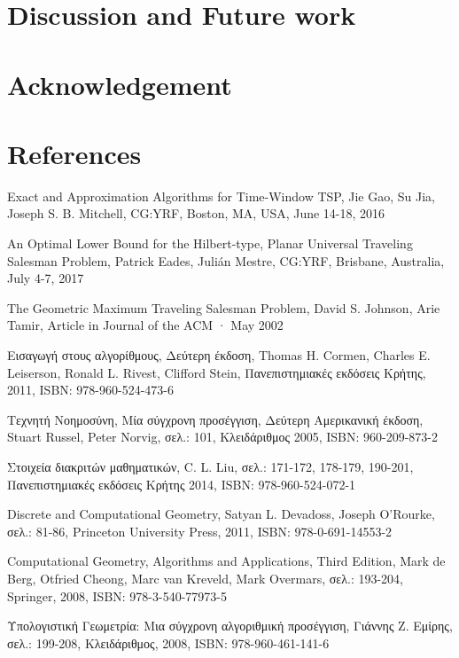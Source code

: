 \documentclass[oneside,12pt]{book}
\theoremstyle{definition}
\begin{document}
\chapter{Discussion and Future work}

\chapter{Acknowledgement}

\chapter{References}
\begin{thebibliography}{depth}
	Exact and Approximation Algorithms for Time-Window TSP, 
	Jie Gao, Su Jia, Joseph S. B. Mitchell,
	CG:YRF, Boston, MA, USA, June 14-18, 2016
	
	An Optimal Lower Bound for the Hilbert-type, Planar Universal Traveling Salesman Problem, 
	Patrick Eades, Julián Mestre,
	CG:YRF, Brisbane, Australia, July 4-7, 2017
	
	The Geometric Maximum Traveling Salesman Problem, 
	David S. Johnson, Arie Tamir,
	Article in Journal of the ACM · May 2002
	
	Εισαγωγή στους αλγορίθμους, Δεύτερη έκδοση, 
	Thomas H. Cormen, Charles E. Leiserson, Ronald L. Rivest, Clifford Stein,
	Πανεπιστημιακές εκδόσεις Κρήτης, 2011,
	ISBN: 978-960-524-473-6
	
	Τεχνητή Νοημοσύνη, Μία σύγχρονη προσέγγιση, Δεύτερη Αμερικανική έκδοση, 
	Stuart Russel, Peter Norvig,
	σελ.: 101,
	Κλειδάριθμος 2005,
	ISBN: 960-209-873-2
	
	Στοιχεία διακριτών μαθηματικών, 
	C. L. Liu,
	σελ.: 171-172, 178-179, 190-201,
	Πανεπιστημιακές εκδόσεις Κρήτης 2014, 
	ISBN: 978-960-524-072-1	
	
	Discrete and Computational Geometry, 
	Satyan L. Devadoss, Joseph O'Rourke,
	σελ.: 81-86,
	Princeton University Press, 2011, 
	ISBN: 978-0-691-14553-2
	
	Computational Geometry,	Algorithms and Applications, Third Edition, 
	Mark de Berg, Otfried Cheong, Marc van Kreveld, Mark Overmars,
	σελ.: 193-204,
	Springer, 2008, 
	ISBN: 978-3-540-77973-5
	
	Υπολογιστική Γεωμετρία: Μια σύγχρονη αλγοριθμική προσέγγιση, 
	Γιάννης Ζ. Εμίρης,
	σελ.: 199-208,
	Κλειδάριθμος, 2008, 
	ISBN: 978-960-461-141-6 
	

\end{thebibliography}
\end{document}
